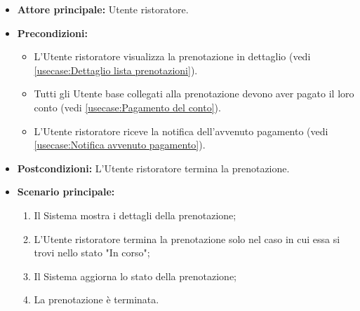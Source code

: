 \label{usecase:Termina prenotazione}
\begin{itemize}
	\item \textbf{Attore principale:} Utente ristoratore.

	\item \textbf{Precondizioni:} 
    \begin{itemize}
        \item L'Utente ristoratore visualizza la prenotazione in dettaglio (vedi \autoref{usecase:Dettaglio lista prenotazioni}).
        \item Tutti gli Utente base collegati alla prenotazione devono aver pagato il loro conto (vedi \autoref{usecase:Pagamento del conto}).
        \item L'Utente ristoratore riceve la notifica dell'avvenuto pagamento (vedi \autoref{usecase:Notifica avvenuto pagamento}).
    \end{itemize}

	\item \textbf{Postcondizioni:} L'Utente ristoratore termina la prenotazione.


	\item \textbf{Scenario principale:}
	      \begin{enumerate}
		      \item Il Sistema mostra i dettagli della prenotazione;
		      \item L'Utente ristoratore termina la prenotazione solo nel caso in cui essa si trovi nello stato "In corso";
		      \item Il Sistema aggiorna lo stato della prenotazione;
		      \item La prenotazione è terminata.

	      \end{enumerate}
\end{itemize}
